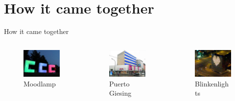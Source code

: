 \documentclass{beamer}
\begin{document}
\section{How it came together}
\begin{frame}{How it came together}

\begin{columns}%
\begin{column}{3.5cm}
        \begin{figure}
          \begin{center}
          \includegraphics[width=3cm]{bilder/ddc_har.jpg}
          \caption{Moodlamp}
          \end{center}
        \end{figure}
\end{column}
\begin{column}{3.5cm}
        \begin{figure}
          \begin{center}
          \includegraphics[width=3cm]{bilder/hertie.jpg}
          \caption{Puerto Giesing}
          \end{center}
        \end{figure}
\end{column}
\begin{column}{3.5cm}
        \begin{figure}
          \begin{center}
          \includegraphics[width=3cm]{bilder/blinkenlights.jpg}
          \caption{Blinkenlights}

\end{center}
\end{figure}
\end{column}
\end{columns}
\end{frame}
\end{document}
